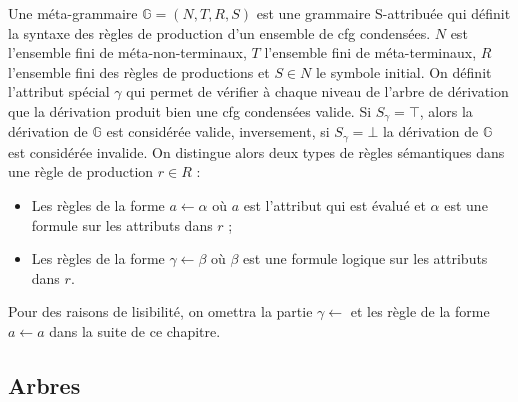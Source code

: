 \begin{definition}
    Une méta-grammaire $\mathbb{G} = (N, T, R, S)$ est une grammaire S-attribuée qui définit la syntaxe des règles de production d'un ensemble de \gls{cfg} condensées.
    $N$ est l'ensemble fini de méta-non-terminaux, $T$ l'ensemble fini de méta-terminaux, $R$ l'ensemble fini des règles de productions et $S \in N$ le symbole initial.
    On définit l'attribut spécial $\gamma$ qui permet de vérifier à chaque niveau de l'arbre de dérivation que la dérivation produit bien une \gls{cfg} condensées valide.
    Si $S_\gamma = \top$, alors la dérivation de $\mathbb{G}$ est considérée valide, inversement, si $S_\gamma = \bot$ la dérivation de $\mathbb{G}$ est considérée invalide.
    On distingue alors deux types de règles sémantiques dans une règle de production $r \in R$ :
    \begin{itemize}
        \item Les règles de la forme $a \gets \alpha$ où $a$ est l'attribut qui est évalué et $\alpha$ est une formule sur les attributs dans $r$ ;
        \item Les règles de la forme $\gamma \gets \beta$ où $\beta$ est une formule logique sur les attributs dans $r$.
    \end{itemize}
    Pour des raisons de lisibilité, on omettra la partie $\gamma \gets$ et les règle de la forme $a \gets a$ dans la suite de ce chapitre.
\end{definition}

\subsection{Arbres}

